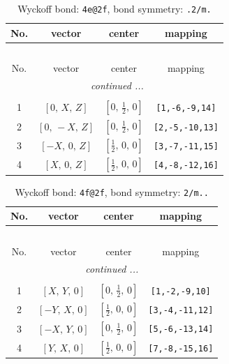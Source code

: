 \documentclass[fleqn,8pt]{jsarticle}
\begin{document}
\renewcommand{\arraystretch}{1.2}
\begin{longtable}{cccc}
\caption{Wyckoff bond: {\tt 4e@2f}, bond symmetry: {\tt .2/m.}}
 \\
 \hline \hline
No. & vector & center & mapping \\ \hline \endfirsthead

\multicolumn{3}{l}{\tablename\ \thetable{}} \\
 \hline \hline
No. & vector & center & mapping \\ \hline \endhead

 \hline \hline
\multicolumn{3}{r}{\footnotesize\it continued ...} \\ \endfoot

 \hline \hline
\multicolumn{3}{r}{} \\ \endlastfoot

1 & $\left[ 0,\, X,\, Z \right]$ & $\left[ 0,\, \frac{1}{2},\, 0 \right]$ & {\tt [1,-6,-9,14]} \\ \hline
2 & $\left[ 0,\, - X,\, Z \right]$ & $\left[ 0,\, \frac{1}{2},\, 0 \right]$ & {\tt [2,-5,-10,13]} \\ \hline
3 & $\left[ - X,\, 0,\, Z \right]$ & $\left[ \frac{1}{2},\, 0,\, 0 \right]$ & {\tt [3,-7,-11,15]} \\ \hline
4 & $\left[ X,\, 0,\, Z \right]$ & $\left[ \frac{1}{2},\, 0,\, 0 \right]$ & {\tt [4,-8,-12,16]} \\
\end{longtable}
\renewcommand{\arraystretch}{1.2}
\begin{longtable}{cccc}
\caption{Wyckoff bond: {\tt 4f@2f}, bond symmetry: {\tt 2/m..}}
 \\
 \hline \hline
No. & vector & center & mapping \\ \hline \endfirsthead

\multicolumn{3}{l}{\tablename\ \thetable{}} \\
 \hline \hline
No. & vector & center & mapping \\ \hline \endhead

 \hline \hline
\multicolumn{3}{r}{\footnotesize\it continued ...} \\ \endfoot

 \hline \hline
\multicolumn{3}{r}{} \\ \endlastfoot

1 & $\left[ X,\, Y,\, 0 \right]$ & $\left[ 0,\, \frac{1}{2},\, 0 \right]$ & {\tt [1,-2,-9,10]} \\ \hline
2 & $\left[ - Y,\, X,\, 0 \right]$ & $\left[ \frac{1}{2},\, 0,\, 0 \right]$ & {\tt [3,-4,-11,12]} \\ \hline
3 & $\left[ - X,\, Y,\, 0 \right]$ & $\left[ 0,\, \frac{1}{2},\, 0 \right]$ & {\tt [5,-6,-13,14]} \\ \hline
4 & $\left[ Y,\, X,\, 0 \right]$ & $\left[ \frac{1}{2},\, 0,\, 0 \right]$ & {\tt [7,-8,-15,16]} \\
\end{longtable}
\end{document}
